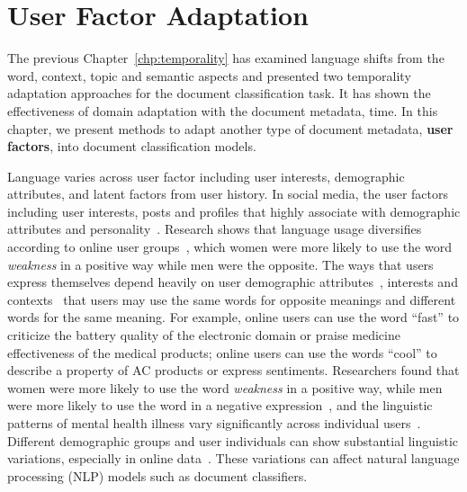 \chapter{User Factor Adaptation}
\label{chp:user}

The previous Chapter~\ref{chp:temporality} has examined language shifts from the word, context, topic and semantic aspects and presented two temporality adaptation approaches for the document classification task. 
It has shown the effectiveness of domain adaptation with the document metadata, time.
In this chapter, we present methods to adapt another type of document metadata, \textbf{user factors}, into document classification models. 

Language varies across user factor including user interests, demographic attributes, and latent factors from user history.
In social media, the user factors including user interests, posts and profiles that highly associate with demographic attributes and personality~\cite{lynn2017human}.
Research shows that language usage diversifies according to online user groups~\cite{volkova2013exploring}, which women were more likely to use the word \textit{weakness} in a positive way while men were the opposite.
The ways that users express themselves depend heavily on user demographic attributes~\cite{hovy2018improving}, interests and contexts~\cite{oba2019modeling} that users may use the same words for opposite meanings and different words for the same meaning.
For example, online users can use the word ``fast'' to criticize the battery quality of the electronic domain or praise medicine effectiveness of the medical products; online users can use the words ``cool'' to describe a property of AC products or express sentiments.
Researchers found that women were more likely to use the word \textit{weakness} in a positive way, while men were more likely to use the word in a negative expression~\cite{volkova2013exploring}, and the linguistic patterns of mental health illness vary significantly across individual users~\cite{amir2017quantifying}.
Different demographic groups and user individuals can show substantial linguistic variations, especially in online data~\cite{johannsen2015cross, goel2016social, pan2019social}. 
These variations can affect natural language processing (NLP) models such as document classifiers.

